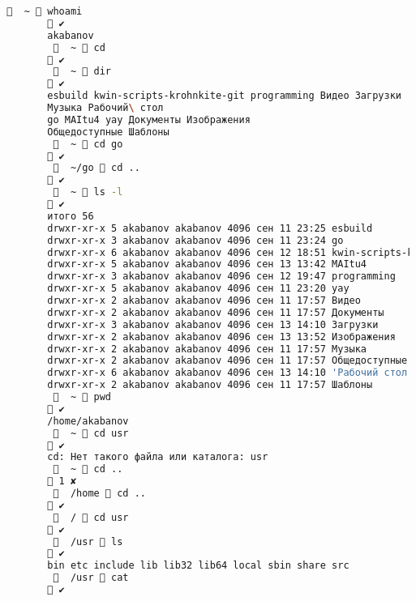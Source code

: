\documentclass{article}
\begin{document}
\begin{lstlisting}[language=bash]
		     ~  whoami
		 ✔
		akabanov
		     ~  cd
		 ✔
		     ~  dir
		 ✔
		esbuild kwin-scripts-krohnkite-git programming Видео Загрузки
		Музыка Рабочий\ стол
		go MAItu4 yay Документы Изображения
		Общедоступные Шаблоны
		     ~  cd go
		 ✔
		     ~/go  cd ..
		 ✔
		     ~  ls -l
		 ✔
		итого 56
		drwxr-xr-x 5 akabanov akabanov 4096 сен 11 23:25 esbuild
		drwxr-xr-x 3 akabanov akabanov 4096 сен 11 23:24 go
		drwxr-xr-x 6 akabanov akabanov 4096 сен 12 18:51 kwin-scripts-krohnkite-git
		drwxr-xr-x 5 akabanov akabanov 4096 сен 13 13:42 MAItu4
		drwxr-xr-x 3 akabanov akabanov 4096 сен 12 19:47 programming
		drwxr-xr-x 5 akabanov akabanov 4096 сен 11 23:20 yay
		drwxr-xr-x 2 akabanov akabanov 4096 сен 11 17:57 Видео
		drwxr-xr-x 2 akabanov akabanov 4096 сен 11 17:57 Документы
		drwxr-xr-x 3 akabanov akabanov 4096 сен 13 14:10 Загрузки
		drwxr-xr-x 2 akabanov akabanov 4096 сен 13 13:52 Изображения
		drwxr-xr-x 2 akabanov akabanov 4096 сен 11 17:57 Музыка
		drwxr-xr-x 2 akabanov akabanov 4096 сен 11 17:57 Общедоступные
		drwxr-xr-x 6 akabanov akabanov 4096 сен 13 14:10 'Рабочий стол'
		drwxr-xr-x 2 akabanov akabanov 4096 сен 11 17:57 Шаблоны
		     ~  pwd
		 ✔
		/home/akabanov
		     ~  cd usr
		 ✔
		cd: Нет такого файла или каталога: usr
		     ~  cd ..
		 1 ✘
		     /home  cd ..
		 ✔
		     /  cd usr
		 ✔
		     /usr  ls
		 ✔
		bin etc include lib lib32 lib64 local sbin share src
		     /usr  cat
		 ✔
		
	\end{lstlisting}
\end{document}
